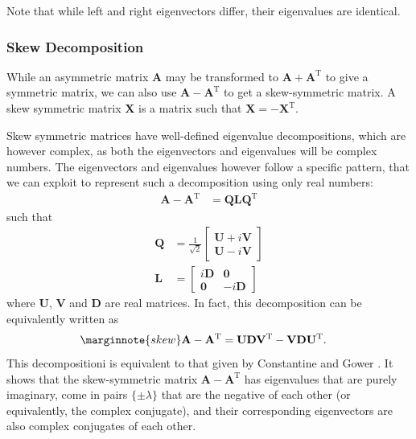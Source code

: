 \documentclass{article}
\begin{document}
Note that while left and right eigenvectors differ, their eigenvalues
are identical. 

\subsubsection{Skew Decomposition}
While an asymmetric matrix $\mathbf A$ may be transformed to $\mathbf A
+ \mathbf A^{\mathrm T}$ to give a symmetric matrix, we can also use
$\mathbf A - \mathbf A^{\mathrm T}$ to get a skew-symmetric matrix.  A
skew symmetric matrix $\mathbf X$ is a matrix such that $\mathbf X =
-\mathbf X^{\mathrm T}$.

Skew symmetric matrices have well-defined eigenvalue decompositions,
which are however complex, as both the eigenvectors and eigenvalues will
be complex numbers.  The eigenvectors and eigenvalues however follow a
specific pattern, that we can exploit to represent such a decomposition
using only real numbers:
\begin{align}
  \mathbf A - \mathbf A^{\mathrm T} &= \mathbf Q \mathbf L \mathbf Q^{\mathrm T}
\end{align}
such that
\begin{align}
  \mathbf Q &= \frac 1 {\sqrt{2}} \left[
    \begin{array}{cc}
      \mathbf U + i \mathbf V \\
      \mathbf U - i \mathbf V 
    \end{array}
    \right] \\
  \mathbf L &= \left[ \begin{array}{cc}
      i \mathbf D & \mathbf 0 \\
      \mathbf 0 & -i \mathbf D
    \end{array} \right]
\end{align}
where $\mathbf U$, $\mathbf V$ and $\mathbf D$ are real matrices.  In
fact, this decomposition can be equivalently written as
\begin{align}
  \marginnote{skew}
  \mathbf A - \mathbf A^{\mathrm T} &=
  \mathbf U \mathbf D \mathbf V^{\mathrm T} - \mathbf V \mathbf D \mathbf U^{\mathrm T}.
\end{align}
This decompositioni is equivalent to that given by Constantine and Gower
\cite{b869}.  It shows that the skew-symmetric matrix $\mathbf A -
\mathbf A^{\mathrm T}$ has eigenvalues that are purely imaginary, come
in pairs $\{\pm \lambda\}$ that are the negative of each other (or
equivalently, the complex conjugate), and their corresponding
eigenvectors are also complex conjugates of each other.
\end{document}
